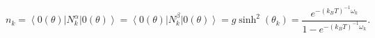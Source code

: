 \begin{equation}
n_{k}=\left\langle 0\left( \theta \right) \right| N_{k}^{\alpha}
\left| 0 \left( \theta\right) \right\rangle=
\left\langle 0\left( \theta \right) \right| N_{k}^{\beta}
\left| 0 \left( \theta\right) \right\rangle=
g\sinh^{2}\left( \theta_{k} \right)=
\frac{e^{-\left( k_{B}T\right) ^{-1}\omega _{k}}}
{1-e^{-\left( k_{B}T\right) ^{-1}\omega _{k}}} .
\label{nst} 
\end{equation}

